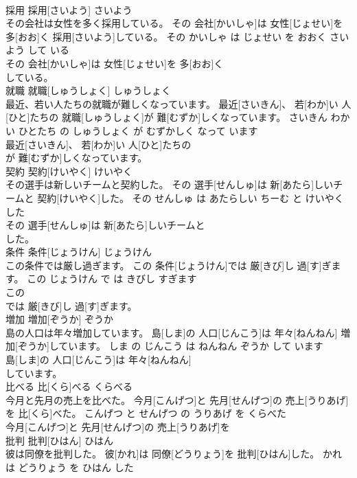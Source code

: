 \documentclass[8pt]{extreport}
\begin{document}
\begin{CJK}{UTF8}{min}
\\	採用	採用[さいよう]	さいよう	
\\	その会社は女性を多く採用している。	その 会社[かいしゃ]は 女性[じょせい]を 多[おお]く 採用[さいよう]している。	その かいしゃ は じょせい を おおく さいよう して いる	
\\	その 会社[かいしゃ]は 女性[じょせい]を 多[おお]く
\\	している。			
\\	就職	就職[しゅうしょく]	しゅうしょく	
\\	最近、若い人たちの就職が難しくなっています。	最近[さいきん]、 若[わか]い 人[ひと]たちの 就職[しゅうしょく]が 難[むずか]しくなっています。	さいきん わかい ひとたち の しゅうしょく が むずかしく なって います	
\\	最近[さいきん]、 若[わか]い 人[ひと]たちの
\\	が 難[むずか]しくなっています。			
\\	契約	契約[けいやく]	けいやく	
\\	その選手は新しいチームと契約した。	その 選手[せんしゅ]は 新[あたら]しいチームと 契約[けいやく]した。	その せんしゅ は あたらしい ちーむ と けいやく した	
\\	その 選手[せんしゅ]は 新[あたら]しいチームと
\\	した。			
\\	条件	条件[じょうけん]	じょうけん	
\\	この条件では厳し過ぎます。	この 条件[じょうけん]では 厳[きび]し 過[す]ぎます。	この じょうけん で は きびし すぎます	
\\	この
\\	では 厳[きび]し 過[す]ぎます。			
\\	増加	増加[ぞうか]	ぞうか	
\\	島の人口は年々増加しています。	島[しま]の 人口[じんこう]は 年々[ねんねん] 増加[ぞうか]しています。	しま の じんこう は ねんねん ぞうか して います	
\\	島[しま]の 人口[じんこう]は 年々[ねんねん]
\\	しています。			
\\	比べる	比[くら]べる	くらべる	
\\	今月と先月の売上を比べた。	今月[こんげつ]と 先月[せんげつ]の 売上[うりあげ]を 比[くら]べた。	こんげつ と せんげつ の うりあげ を くらべた	
\\	今月[こんげつ]と 先月[せんげつ]の 売上[うりあげ]を
\\	批判	批判[ひはん]	ひはん	
\\	彼は同僚を批判した。	彼[かれ]は 同僚[どうりょう]を 批判[ひはん]した。	かれ は どうりょう を ひはん した	

\end{CJK}
\end{document}
